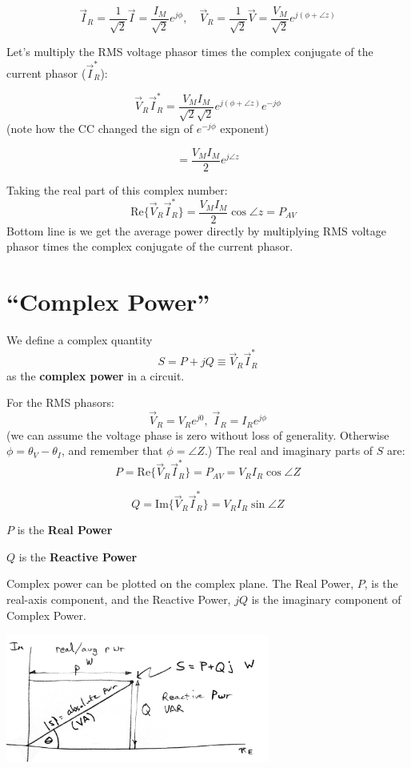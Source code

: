 \[
\vec{I}_R = \frac{1}{\sqrt{2}} \vec{I} = \frac{I_M}{\sqrt{2}} e^{j\phi}, \quad \vec{V}_R = \frac{1}{\sqrt{2}} \vec{V} = \frac{V_M}{\sqrt{2}} e^{j(\phi + \angle z)}
\]

Let's multiply the RMS voltage phasor times the complex conjugate of the current
phasor ($\vec I_R^*$):

\[
\vec{V}_R \vec{I}_R^* = \frac{V_M I_M}{\sqrt{2}\sqrt{2}} e^{j(\phi + \angle z)} e^{-j\phi}
\]
(note how the CC changed the sign of $e^{-j\phi}$ exponent)

\[
= \frac{V_M I_M}{2} e^{j\angle z}
\]

Taking the real part of this complex number:
\[
\quad \text{Re}\{\vec{V}_R \vec{I}_R^*\} = \frac{V_M I_M}{2} \cos \angle z = P_{AV}
\]
Bottom line is we get the average power directly by multiplying RMS voltage phasor
times the complex conjugate of the current phasor.






\section{ ``Complex Power''}






We define a complex quantity
\[
S = P + jQ \equiv \vec{V}_R \vec{I}_R^*
\]
as the {\bf complex power} in a circuit.

For the RMS phasors:
\[
\vec V_R = V_Re^{j0},\;\vec I_R=I_Re^{j\phi}
\]
(we can assume the voltage phase is zero without loss of generality. Otherwise
$\phi = \theta_V - \theta_I$, and remember that $\phi = \angle{Z}$.)
The real and imaginary parts of $S$ are:
\[
P = \text{Re}\{\vec{V}_R \vec{I}_R^*\} = P_{AV} = V_R I_R \cos \angle Z
\]

\[
Q = \text{Im}\{\vec{V}_R \vec{I}_R^*\} = V_R I_R \sin \angle Z
\]

$P$ is the {\bf Real Power}

$Q$ is the {\bf Reactive Power}

Complex power can be plotted on the complex plane.  The Real Power, $P$, is
the real-axis component, and the Reactive Power, $jQ$ is the imaginary component
of Complex Power.

\vspace{0.25in}
\includegraphics[width=0.65\textwidth]{figsChapt03/A69D31.png}

